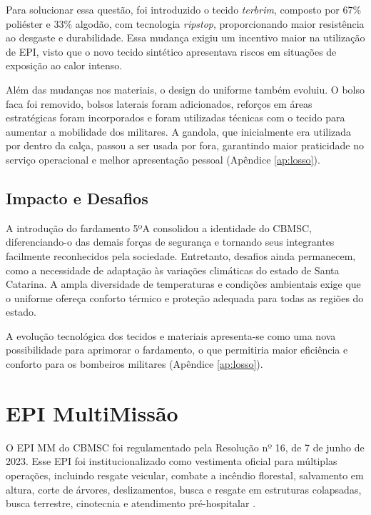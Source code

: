 Para solucionar essa questão, foi introduzido o tecido \textit{terbrim}, composto por 67\% poliéster
 e 33\% algodão, com tecnologia \textit{ripstop}, proporcionando maior resistência ao desgaste 
 e durabilidade. Essa mudança exigiu um incentivo maior na utilização de 
 \acrfull{EPI}, visto que o novo tecido sintético apresentava riscos em situações de exposição 
 ao calor intenso.

Além das mudanças nos materiais, o design do uniforme também evoluiu. O bolso faca foi removido, 
bolsos laterais foram adicionados, reforços em áreas estratégicas foram incorporados e foram utilizadas
técnicas com o tecido para aumentar a mobilidade dos militares. A gandola, que inicialmente 
era utilizada por dentro da calça, passou a ser usada por fora, garantindo maior praticidade no 
serviço operacional e melhor apresentação pessoal (Apêndice \ref{ap:losso}).

\subsection{Impacto e Desafios}

A introdução do fardamento 5ºA consolidou a identidade do \acrshort{CBMSC}, diferenciando-o das 
demais forças de segurança e tornando seus integrantes facilmente reconhecidos pela sociedade. 
Entretanto, desafios ainda permanecem, como a necessidade de adaptação às variações climáticas 
do estado de Santa Catarina. A ampla diversidade de temperaturas e condições ambientais exige 
que o uniforme ofereça conforto térmico e proteção adequada para todas as regiões do estado.

A evolução tecnológica dos tecidos e materiais apresenta-se como uma nova possibilidade
 para aprimorar o fardamento, o que permitiria maior eficiência e conforto para os bombeiros 
 militares (Apêndice \ref{ap:losso}). 


\section{EPI MultiMissão}

O \acrshort{EPI} \acrfull{MM} do \acrshort{CBMSC} foi regulamentado pela Resolução nº 16, de 7 de junho de 2023. Esse \acrlong{EPI} foi institucionalizado como 
vestimenta oficial para múltiplas operações, incluindo resgate veicular, combate a incêndio 
florestal, salvamento em altura, corte de árvores, deslizamentos, busca e resgate em 
estruturas colapsadas, busca terrestre, cinotecnia e atendimento pré-hospitalar \cite{res16}.

